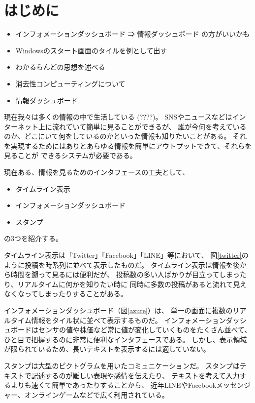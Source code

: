 \section{はじめに}

\begin{itemize}
\item インフォメーションダッシュボード ⇒ 情報ダッシュボード の方がいいかも
\item Windowsのスタート画面のタイルを例として出す
\item わかるらんどの思想を述べる
\item 消去性コンピューティングについて\cite{kurihara2016}
\item 情報ダッシュボード\cite{few}
\end{itemize}


現在我々は多くの情報の中で生活している (????)。
SNSやニュースなどはインターネット上に流れていて簡単に見ることができるが、
誰が今何を考えているのか、どこにいて何をしているのかといった情報も知りたいことがある。
それを実現するためにはありとあらゆる情報を簡単にアウトプットできて、それらを見ることが
できるシステムが必要である。

現在ある、情報を見るためのインタフェースの工夫として、
\begin{itemize}
\item タイムライン表示
\item インフォメーションダッシュボード
\item スタンプ
\end{itemize}
の3つを紹介する。

タイムライン表示は「Twitter」「Facebook」「LINE」等において、
図\ref{twitter}のように投稿を時系列に並べて表示したものだ。
タイムライン表示は情報を後から時間を遡って見るには便利だが、
投稿数の多い人ばかりが目立ってしまったり、リアルタイムに何かを知りたい時に
同時に多数の投稿があると流れて見えなくなってしまったりすることがある。

インフォメーションダッシュボード（図\ref{azure}）は、
単一の画面に複数のリアルタイム情報をタイル状に並べて表示するものだ。
インフォメーションダッシュボードはセンサの値や株価など常に値が変化していくものをたくさん並べて、
ひと目で把握するのに非常に便利なインタフェースである。
しかし、表示領域が限られているため、長いテキストを表示するには適していない。

スタンプは大型のピクトグラムを用いたコミュニケーションだ。
スタンプはテキストで記述するのが難しい表現や感情を伝えたり、
テキストを考えて入力するよりも速くて簡単であったりすることから、
近年LINEやFacebookメッセンジャー、オンラインゲームなどで広く利用されている。


